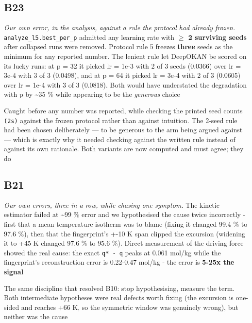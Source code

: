 \documentclass[10pt]{article}
\begin{document}
\subsection*{B23}\label{led:B23}
\begin{description}[leftmargin=0pt,itemsep=1pt]
\item[Defect.] \emph{Our own error, in the analysis, against a rule the protocol had already frozen.} \texttt{analyze\_l5.best\_per\_p} admitted any learning rate with \textbf{$\geq$ 2 surviving seeds} after collapsed runs were removed. Protocol rule 5 freezes \textbf{three} seeds as the minimum for any reported number. The lenient rule let DeepOKAN be scored on its lucky runs: at p = 32 it picked lr = 1e-3 with 2 of 3 seeds (0.0366) over lr = 3e-4 with 3 of 3 (0.0498), and at p = 64 it picked lr = 3e-4 with 2 of 3 (0.0605) over lr = 1e-4 with 3 of 3 (0.0818). Both would have understated the degradation with p by \textasciitilde{}35 \% while appearing to be the \emph{generous} choice
\item[How it was caught.] Caught before any number was reported, while checking the printed seed counts \texttt{(2s)} against the frozen protocol rather than against intuition. The 2-seed rule had been chosen deliberately --- to be generous to the arm being argued against --- which is exactly why it needed checking against the written rule instead of against its own rationale. Both variants are now computed and must agree; they do
\end{description}
\subsection*{B21}\label{led:B21}
\begin{description}[leftmargin=0pt,itemsep=1pt]
\item[Defect.] \emph{Our own errors, three in a row, while chasing one symptom.} The kinetic estimator failed at \textasciitilde{}99 \% error and we hypothesised the cause twice incorrectly - first that a mean-temperature isotherm was to blame (fixing it changed 99.4 \% to 97.6 \%), then that the fingerprint's +-10 K span clipped the excursion (widening it to +45 K changed 97.6 \% to 95.6 \%). Direct measurement of the driving force showed the real cause: the exact \texttt{q* - q} peaks at 0.061 mol/kg while the fingerprint's reconstruction error is 0.22-0.47 mol/kg - the error is \textbf{5-25x the signal}
\item[How it was caught.] The same discipline that resolved B10: stop hypothesising, measure the term. Both intermediate hypotheses were real defects worth fixing (the excursion is one-sided and reaches +66 K, so the symmetric window was genuinely wrong), but neither was the cause
\end{description}
\end{document}
